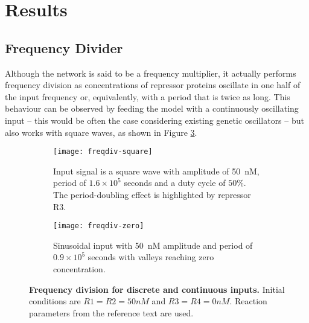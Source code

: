 \section{Results}

  \subsection{Frequency Divider}

    Although the network is said to be a frequency multiplier, it actually performs frequency division as concentrations of repressor proteins oscillate in one half of the input frequency or, equivalently, with a period that is twice as long.
    This behaviour can be observed by feeding the model with a continuously oscillating input -- this would be often the case considering existing genetic oscillators -- but also works with square waves, as shown in Figure \ref{fig.freqdiv-square-zero}.

    \begin{figure}[!htb]
      \centering
      \begin{subfigure}[t]{0.4\textwidth}
        \centering
        \texttt{[image: freqdiv-square]}
        \caption{Input signal is a square wave with amplitude of \SI{50}{\nano M}, period of $1.6 \times 10^5$ seconds and a duty cycle of $50\%$. The period-doubling effect is highlighted by repressor R3.}
        \label{fig.freqdiv-square}
      \end{subfigure}
      \hspace{1em}
      \begin{subfigure}[t]{0.4\textwidth}
        \centering
        \texttt{[image: freqdiv-zero]}
        \caption{Sinusoidal input with \SI{50}{\nano M} amplitude and period of $0.9 \times 10^5$ seconds with valleys reaching zero concentration.}
        \label{fig.freqdiv-zero}
      \end{subfigure}
      \caption{\textbf{Frequency division for discrete and continuous inputs.} Initial conditions are $R1 = R2 = 50nM$ and $R3 = R4 = 0nM$. Reaction parameters from the reference text are used.}
      \label{fig.freqdiv-square-zero}
    \end{figure}

